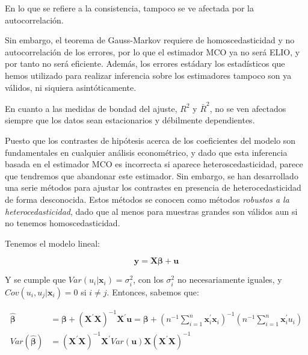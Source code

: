 En lo que se refiere a la consistencia, tampoco se ve afectada por la autocorrelaci\'on.

Sin embargo, el teorema de Gauss-Markov requiere de homoscedasticidad y no autocorrelaci\'on de los errores, por lo que el estimador MCO ya no ser\'a ELIO, y por tanto no ser\'a eficiente. Adem\'as, los errores est\'adary los estad\'isticos que hemos utilizado para realizar inferencia sobre los estimadores tampoco son ya v\'alidos, ni siquiera asint\'oticamente.

En cuanto a las medidas de bondad del ajuste, $R^2$ y $\bar{R}^2$, no se ven afectados siempre que los datos sean estacionarios y d\'ebilmente dependientes.



Puesto que los contrastes de hip\'otesis acerca de los coeficientes del modelo son fundamentales en cualquier an\'alisis econom\'etrico, y dado que esta inferencia basada en el estimador MCO es incorrecta si aparece heteroscedasticidad, parece que tendremos que abandonar este estimador. Sin embargo, se han desarrollado una serie m\'etodos para ajustar los contrastes en presencia de heterocedasticidad de forma desconocida. Estos m\'etodos se conocen como m\'etodos \textit{robustos a la heterocedasticidad}, dado que al menos para muestras grandes son v\'alidos aun si no tenemos homoscedasticidad.

Tenemos el modelo lineal:

\begin{equation*}
\boldsymbol{y}=\boldsymbol{X\beta}+\boldsymbol{u}
\end{equation*}

Y se cumple que $Var(u_i|\boldsymbol{x}_i)=\sigma^2_i$, con los $\sigma^2_i$ no necesariamente iguales, y $Cov(u_i,u_j|\boldsymbol{x}_i)=0$ si $i\neq j$. Entonces, sabemos que:

\begin{align*}
\hat{\boldsymbol{\beta}}&=\boldsymbol{\beta}+\left(\boldsymbol{X}^{\prime}\boldsymbol{X}\right)^{-1}\boldsymbol{X}^{\prime}\boldsymbol{u}= \boldsymbol{\beta}+\left(n^{-1}\sum_{i=1}^n\boldsymbol{x}_i^{\prime}\boldsymbol{x}_i\right)^{-1}\left(n^{-1}\sum_{i=1}^n\boldsymbol{x}_i^{\prime}u_i\right)\\
Var(\hat{\boldsymbol{\beta}})&=\left(\boldsymbol{X}^{\prime}\boldsymbol{X}\right)^{-1}\boldsymbol{X}^{\prime}Var(\boldsymbol{u})\boldsymbol{X}\left(\boldsymbol{X}^{\prime}\boldsymbol{X}\right)^{-1} \\
\end{align*}


